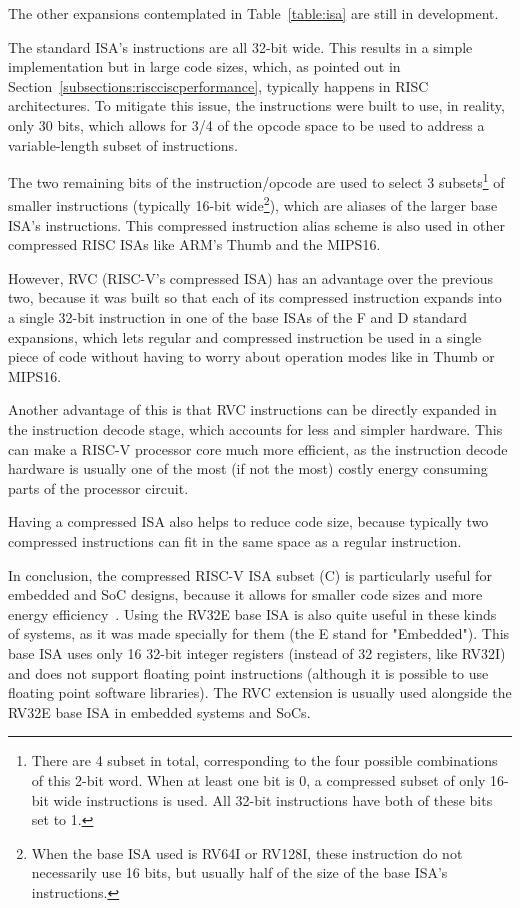 The other expansions contemplated in Table~\ref{table:isa} are still in
development.

The standard ISA's instructions are all 32-bit wide. This results in a simple
implementation but in large code sizes, which, as pointed out in
Section~\ref{subsections:riscciscperformance}, typically happens in RISC
architectures. To mitigate this issue, the instructions were built to use, in
reality, only 30 bits, which allows for 3/4 of the opcode space to be used
to address a variable-length subset of instructions.

The two remaining bits of the instruction/opcode are used to select 3
subsets\footnote{There are 4 subset in total, corresponding to the four possible
  combinations of this 2-bit word. When at least one bit is 0, a compressed
  subset of only 16-bit wide instructions is used. All 32-bit instructions have
  both of these bits set to 1.} of smaller instructions (typically 16-bit
wide\footnote{When the base ISA used is RV64I or RV128I, these instruction do
  not necessarily use 16 bits, but usually half of the size of the base ISA's
  instructions.}), which are aliases of the larger base ISA's instructions. This
compressed instruction alias scheme is also used in other compressed RISC ISAs
like ARM's Thumb and the MIPS16.

However, RVC (RISC-V's compressed ISA) has an advantage over the previous two,
because it was built so that each of its compressed instruction expands into a
single 32-bit instruction in one of the base ISAs of the F and D standard
expansions, which lets regular and compressed instruction be used in a single
piece of code without having to worry about operation modes like in Thumb or
MIPS16.

Another advantage of this is that RVC instructions can be directly expanded in
the instruction decode stage, which accounts for less and simpler hardware. This
can make a RISC-V processor core much more efficient, as the instruction decode
hardware is usually one of the most (if not the most) costly energy consuming
parts of the processor circuit.

Having a compressed ISA also helps to reduce code size, because typically two
compressed instructions can fit in the same space as a regular instruction.

In conclusion, the compressed RISC-V ISA subset (C) is particularly useful for
embedded and SoC designs, because it allows for smaller code sizes and more
energy efficiency~\cite{bib:compressed}. Using the RV32E base ISA is also quite
useful in these kinds of systems, as it was made specially for them (the E stand
for "Embedded"). This base ISA uses only 16 32-bit integer registers (instead of
32 registers, like RV32I) and does not support floating point instructions
(although it is possible to use floating point software libraries). The RVC
extension is usually used alongside the RV32E base ISA in embedded systems and
SoCs.

